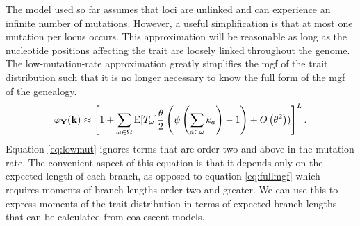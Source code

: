 The model used so far assumes that loci are unlinked and can experience an
infinite number of mutations. However, a useful simplification is that at most
one mutation per locus occurs. This approximation will be reasonable as long as
the nucleotide positions affecting the trait are loosely linked throughout the
genome. The low-mutation-rate approximation greatly simplifies the mgf of the
trait distribution such that it is no longer necessary to know the full form of
the mgf of the genealogy.
\begin{equation}
\label{eq:lowmut}
\varphi_{\mathbf{Y}}(\mathbf{k}) \approx \left[ 1 + \sum_{\omega \in \Omega}
  \mathrm{E}[T_\omega] \frac{\theta}{2} \left( \psi\left( \sum_{a \in \omega} k_a\right) -1 \right) +
  O\left( \theta^2 \right))\right]^L.
\end{equation}
Equation \eqref{eq:lowmut} ignores terms that are order two and above in the
mutation rate. The convenient aspect of this equation is that it depends only on
the expected length of each branch, as opposed to equation \eqref{eq:fullmgf}
which requires moments of branch lengths order two and greater. We can use this
to express moments of the trait distribution in terms of expected branch lengths
that can be calculated from coalescent models.

